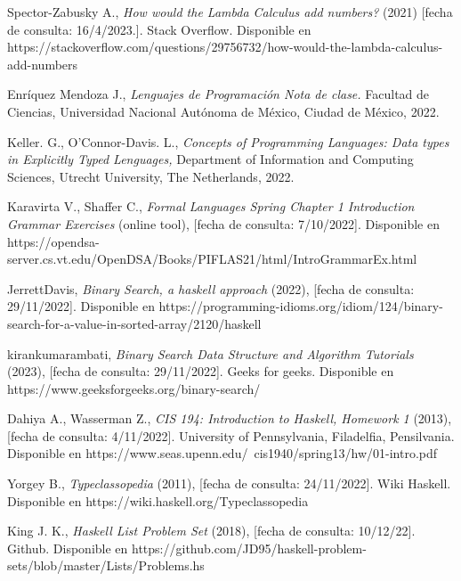 \begin{thebibliography}{11}
    
    \label{sec:11}
    \hypertarget{11}{}
    Spector-Zabusky A., \textit{How would the Lambda Calculus add numbers?} (2021) [fecha de consulta: 16/4/2023.]. Stack Overflow. Disponible en https://stackoverflow.com/questions/29756732/how-would-the-lambda-calculus-add-numbers


    \label{sec:12}
    \hypertarget{12}{}
    Enríquez Mendoza J., \textit{Lenguajes de Programación Nota de clase.} Facultad de Ciencias, Universidad Nacional Autónoma de México, Ciudad de México, 2022.

    
    \label{sec:13}
    \hypertarget{13}{}
    Keller. G., O'Connor-Davis. L., \textit{Concepts of Programming Languages: Data types in Explicitly Typed Lenguages,} Department of Information and Computing Sciences, Utrecht University, The Netherlands,  2022.


    \label{sec:14}
    \hypertarget{14}{}
    Karavirta V., Shaffer C., \textit{Formal Languages Spring Chapter 1 Introduction Grammar Exercises} (online tool),  [fecha de consulta: 7/10/2022]. Disponible en https://opendsa-server.cs.vt.edu/OpenDSA/Books/PIFLAS21/html/IntroGrammarEx.html

    \label{sec:15}
    \hypertarget{15}{}
    JerrettDavis, \textit{Binary Search, a haskell approach} (2022), [fecha de consulta: 29/11/2022]. Disponible en https://programming-idioms.org/idiom/124/binary-search-for-a-value-in-sorted-array/2120/haskell

    \label{sec:16}
    \hypertarget{16}{}
    kirankumarambati, \textit{Binary Search Data Structure and Algorithm Tutorials} (2023), [fecha de consulta: 29/11/2022]. Geeks for geeks. Disponible en https://www.geeksforgeeks.org/binary-search/

    \label{sec:17}
    \hypertarget{17}{}
    Dahiya A., Wasserman Z., \textit{CIS 194: Introduction to Haskell,  Homework 1} (2013), [fecha de consulta: 4/11/2022]. University of Pennsylvania, Filadelfia, Pensilvania. Disponible en https://www.seas.upenn.edu/~cis1940/spring13/hw/01-intro.pdf

    \label{sec:18}
    \hypertarget{18}{}
    Yorgey B., \textit{Typeclassopedia} (2011), [fecha de consulta: 24/11/2022]. Wiki Haskell. Disponible en https://wiki.haskell.org/Typeclassopedia

    \bibitem{}
    \label{sec:19}
    \hypertarget{19}{}
    King J. K., \textit{Haskell List Problem Set} (2018), [fecha de consulta: 10/12/22]. Github. Disponible en https://github.com/JD95/haskell-problem-sets/blob/master/Lists/Problems.hs


\end{thebibliography}

